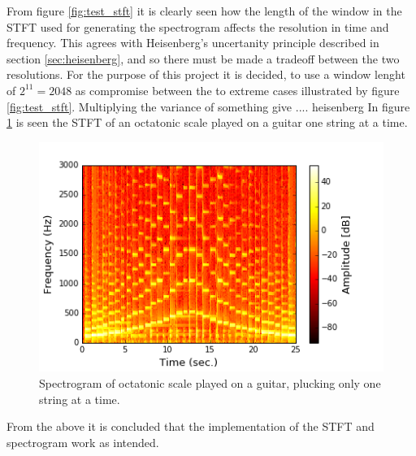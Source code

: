 From figure \ref{fig:test_stft} it is clearly seen how the length of the window in the STFT used for generating the spectrogram affects the resolution in time and frequency. This agrees with Heisenberg's uncertanity principle described in section \ref{sec:heisenberg}, and so there must be made a tradeoff between the two resolutions. For the purpose of this project it is decided, to use a window lenght of $2^{11}=2048$ as compromise between the to extreme cases illustrated by figure \ref{fig:test_stft}. Multiplying the variance of something give .... heisenberg   In figure \ref{fig:STFT_test_signal} is seen the STFT of an octatonic scale played on a guitar one string at a time.
\begin{figure}[H]
\centering
\includegraphics[scale = 0.6]{figures/validation/stft/scale.png}
\caption{Spectrogram of octatonic scale played on a guitar, plucking only one string at a time.}
\label{fig:STFT_test_signal}
\end{figure}
From the above it is concluded that the implementation of the STFT and spectrogram work as intended.
